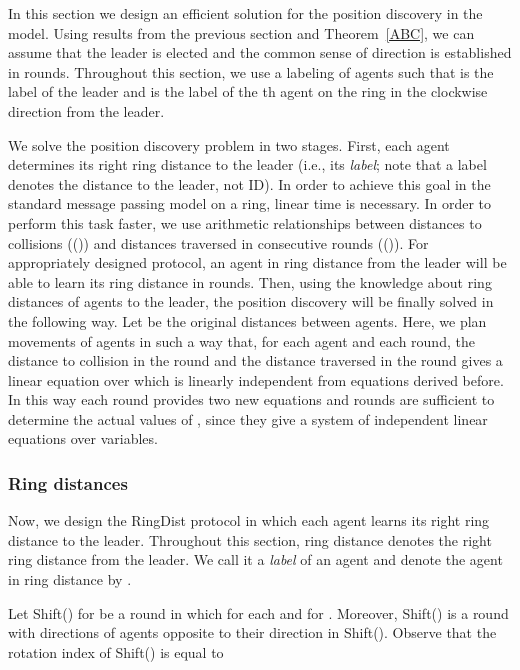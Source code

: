 In this section we design an efficient solution for the position
discovery in the {\perceptive} model. Using results from the previous
section and Theorem~\ref{ABC},
we can assume that the leader is elected and the common sense of direction is established
in  rounds.
Throughout this section, we use a labeling of agents such that  is the label of the leader and  is the
label of the th agent on the ring in the clockwise direction from the leader.


We solve the position discovery problem in two stages. First, each agent determines
its right ring distance to the leader (i.e., its {\em label}; note that a label denotes
the distance to the leader, not ID).  
In order to achieve this goal in the standard message passing model on a ring, linear
time is necessary. In order to perform this task faster, we use arithmetic relationships
between distances to collisions (\coll()) and  distances traversed in consecutive rounds (\pos()).
For appropriately designed protocol, an agent in ring distance  from the leader will
be able to learn its ring distance in  rounds.
Then, using the knowledge about ring distances of agents to the leader, the position discovery
will be finally solved in the following way. Let  be the original distances between agents.
Here, we plan movements of agents in such a way that, for each agent and each round,
the distance to collision in the round and the distance traversed in the round gives a linear equation
over  which is linearly independent from equations
derived before. In this way each round provides two new equations and  rounds are sufficient
to determine the actual values of ,
since they give a system of  independent linear equations over
 variables.




\subsubsection{Ring distances}
Now, we design the RingDist protocol in which each agent learns
its right ring distance to the leader. Throughout this section, ring distance denotes the right ring distance from
the leader. We call it a {\em label} of an agent and denote the agent in ring
distance  by .


Let Shift() for  be a round in which
 for each  and
 for .
Moreover, Shift() is a round with directions of agents
opposite to their direction in Shift().
Observe that the rotation index of Shift() is equal to 


